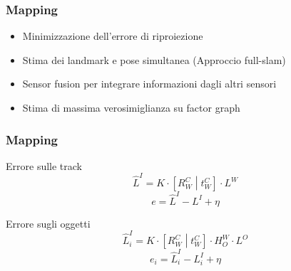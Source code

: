 \documentclass[c]{beamer}
\begin{document}

\begin{frame}
\frametitle{Mapping}

\begin{itemize}
 \item Minimizzazione dell'errore di riproiezione
 \item Stima dei landmark e pose simultanea (Approccio full-slam)
 \item Sensor fusion per integrare informazioni dagli altri sensori
 \item Stima di massima verosimiglianza su factor graph
\end{itemize}


\end{frame}


\begin{frame}
\frametitle{Mapping}

\begin{block}{Errore sulle track}
 \begin{equation*}
  \hat{L}^I =  K\cdot \left[  R^C_W \middle| t^C_W  \right] \cdot L^W
 \end{equation*}
 \begin{equation*}
  e = \hat{L}^I - L^I + \eta
 \end{equation*}
\end{block}
\vskip 1cm
\begin{block}{Errore sugli oggetti}
 \begin{equation*}
  \hat{L}^I_i =  K\cdot \left[  R^C_W \middle| t^C_W  \right] \cdot H^W_O \cdot L^O
 \end{equation*}
 \begin{equation*}
  e_i = \hat{L}^I_i - L^I_i + \eta
 \end{equation*}
\end{block}



\end{frame}
\end{document}
